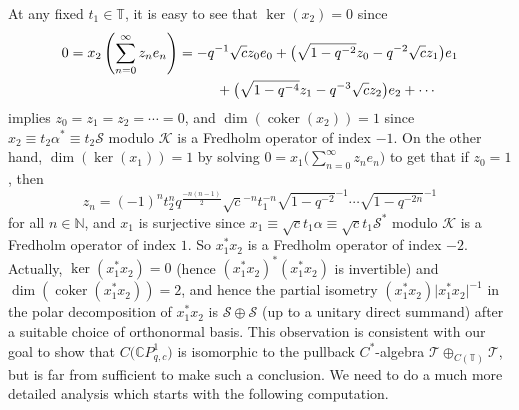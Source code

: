\documentclass[11pt]{article}
\numberwithin{equation}{section}
\begin{document}
At any fixed $t_{1}\in\mathbb{T}$, it is easy to see that $\ker (x_{2}) =0$ since
\begin{gather*}
0=x_{2}\left( \sum_{n=0}^{\infty}z_{n}e_{n}\right) =-q^{-1}\sqrt{c}
z_{0}e_{0}+\big( \sqrt{1-q^{-2}}z_{0}-q^{-2}\sqrt{c}z_{1}\big)
e_{1}\\
\hphantom{0=x_{2}\left( \sum_{n=0}^{\infty}z_{n}e_{n}\right) =}{} +\big( \sqrt{1-q^{-4}}z_{1}-q^{-3}\sqrt{c}z_{2}\big) e_{2}+\cdots
\end{gather*}
implies $z_{0}=z_{1}=z_{2}=\cdots=0$, and $\dim( \operatorname{coker}(
x_{2}) ) =1$ since $x_{2}\equiv t_{2}\alpha^{\ast}\equiv
t_{2}\mathcal{S}$ modulo $\mathcal{K}$ is a Fredholm operator of index $-1$.
On the other hand, $\dim( \ker( x_{1}) ) =1$ by
solving $0=x_{1}\Big( \sum\limits_{n=0}^{\infty}z_{n}e_{n}\Big) $ to get that if
$z_{0}=1$, then
\[
z_{n}=( -1) ^{n}t_{2}^{n}q^{\frac{-n ( n-1 ) }{2}%
}\sqrt{c}^{-n}t_{1}^{-n}\sqrt{1-q^{-2}}^{-1}\cdots\sqrt{1-q^{-2n}}^{-1}%
\]
for all $n\in\mathbb{N}$, and $x_{1}$ is surjective since $x_{1}\equiv\sqrt
{c}t_{1}\alpha\equiv\sqrt{c}t_{1}\mathcal{S}^{\ast}$ modulo $\mathcal{K}$ is a
Fredholm operator of index $1$. So $x_{1}^{\ast}x_{2}$ is a Fredholm operator
of index $-2$. Actually, $\ker ( x_{1}^{\ast}x_{2} ) =0$ (hence
$ ( x_{1}^{\ast}x_{2} ) ^{\ast} ( x_{1}^{\ast}x_{2}) $
is invertible) and $\dim ( \operatorname{coker} ( x_{1}^{\ast}%
x_{2} ) ) =2$, and hence the partial isometry $(
x_{1}^{\ast}x_{2}) \vert x_{1}^{\ast}x_{2}\vert ^{-1}$ in
the polar decomposition of $x_{1}^{\ast}x_{2}$ is $\mathcal{S}\oplus
\mathcal{S}$ (up to a unitary direct summand) after a suitable choice of
orthonormal basis. This observation is consistent with our goal to show that
$C\big( \mathbb{C}P_{q,c}^{1}\big) $ is isomorphic to the pullback
$C^*$-algebra $\mathcal{T}\oplus_{C ( \mathbb{T} ) }\mathcal{T}$, but
is far from sufficient to make such a conclusion. We need to do a much more
detailed analysis which starts with the following computation.
\end{document}
